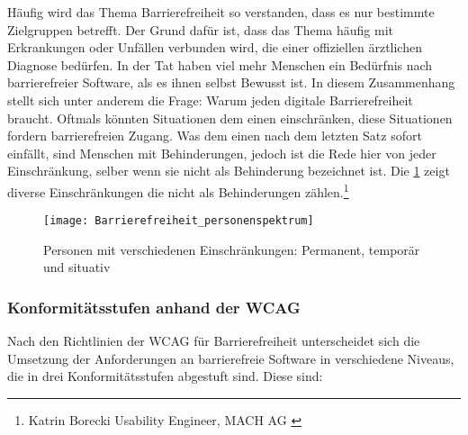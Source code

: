 Häufig wird das Thema Barrierefreiheit so verstanden, dass es nur bestimmte Zielgruppen betrefft. Der Grund dafür ist, dass das Thema häufig mit Erkrankungen oder Unfällen verbunden wird, die einer offiziellen ärztlichen Diagnose bedürfen. In der Tat haben viel mehr Menschen ein Bedürfnis nach barrierefreier Software, als es ihnen selbst Bewusst ist. In diesem Zusammenhang stellt sich unter anderem die Frage: Warum jeden digitale Barrierefreiheit braucht. Oftmals könnten Situationen dem einen einschränken, diese Situationen fordern barrierefreien Zugang. Was dem einen nach dem letzten Satz sofort einfällt, sind Menschen mit Behinderungen, jedoch ist die Rede hier von jeder Einschränkung, selber wenn sie nicht als Behinderung bezeichnet ist. Die \cref{fig:Beispielhafte Einschränkungen} zeigt diverse Einschränkungen die nicht als Behinderungen zählen.\footnote{Katrin Borecki Usability Engineer, MACH AG \cite{mach}}

\begin{figure}[H]
	\centering
	\texttt{[image: Barrierefreiheit\_personenspektrum]}
	\caption[Personen mit verschiedenen Einschränkungen: Permanent, temporär und situativ]{Personen mit verschiedenen Einschränkungen: Permanent, temporär und situativ
	 \cite{mach}}
	\label{fig:Beispielhafte Einschränkungen}
\end{figure}

\subsubsection{Konformitätsstufen anhand der \ac{WCAG}}
\label{subsubsec: Konformitätsstufen}
Nach den Richtlinien der \ac{WCAG} für Barrierefreiheit unterscheidet sich die Umsetzung der Anforderungen an barrierefreie Software in verschiedene Niveaus, die in drei Konformitätsstufen abgestuft sind. Diese sind:

